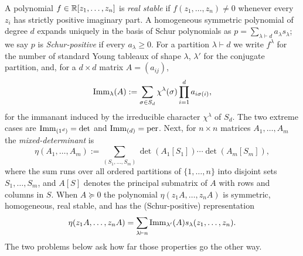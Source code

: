 



\begin{cxcredits}
\end{cxcredits}

\begin{cxcontext}
A polynomial $f\in\mathbb R[z_1,\ldots,z_n]$ is \emph{real stable} if $f(z_1,\ldots,z_n)\ne0$ whenever every $z_i$ has strictly positive imaginary part.  A homogeneous symmetric polynomial of degree $d$ expands uniquely in the basis of Schur polynomials as $p=\sum_{\lambda\vdash d}a_\lambda s_\lambda$; we say $p$ is \emph{Schur-positive} if every $a_\lambda\ge0$.  For a partition $\lambda\vdash d$ we write $f^\lambda$ for the number of standard Young tableaux of shape $\lambda$, $\lambda'$ for the conjugate partition, and, for a $d\times d$ matrix $A=(a_{ij})$,
\[
\operatorname{Imm}_\lambda(A) :=\sum_{\sigma\in S_d}\chi^\lambda(\sigma)\prod_{i=1}^da_{i\sigma(i)},
\]
for the immanant induced by the irreducible character $\chi^\lambda$ of $S_d$. The two extreme cases are $\operatorname{Imm}_{(1^d)}=\det$ and $\operatorname{Imm}_{(d)}=\operatorname{per}$.  Next, for $n\times n$ matrices $A_1,\ldots,A_m$ the \emph{mixed-determinant} is
\[
\eta(A_1,\ldots,A_m) :=\sum_{(S_1,\ldots,S_m)}\det(A_1[S_1])\cdots\det(A_m[S_m]),
\]
where the sum runs over all ordered partitions of $\{1,\ldots,n\}$ into disjoint sets $S_1,\ldots,S_m$, and $A[S]$ denotes the principal submatrix of $A$ with rows and columns in $S$.  When $A\succeq0$ the polynomial $\eta(z_1A,\ldots,z_nA)$ is symmetric, homogeneous, real stable, and has the (Schur-positive) representation
\begin{equation*}
  \eta(z_1A,\ldots,z_nA)=\sum_{\lambda\vdash n}\operatorname{Imm}_{\lambda'}(A)s_\lambda(z_1,\ldots,z_n).
\end{equation*}
The two problems below ask how far those properties go the other way.
\end{cxcontext}

